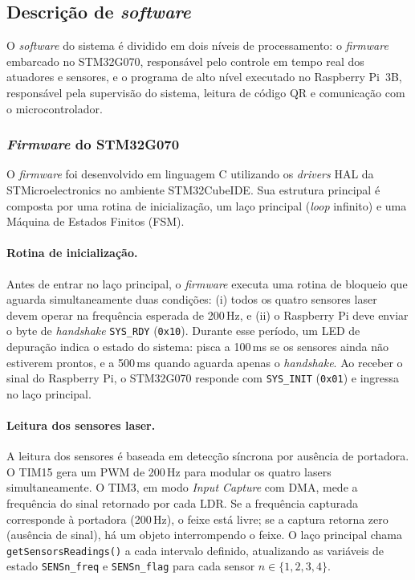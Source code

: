 \subsection{Descrição de \textit{software}}\label{subsec:software}

O \textit{software} do sistema é dividido em dois níveis de processamento:
o \textit{firmware} embarcado no STM32G070, responsável pelo controle em
tempo real dos atuadores e sensores, e o programa de alto nível executado
no Raspberry Pi~3B, responsável pela supervisão do sistema, leitura de
código QR e comunicação com o microcontrolador.

\subsubsection{\textit{Firmware} do STM32G070}

O \textit{firmware} foi desenvolvido em linguagem C utilizando os
\textit{drivers} HAL da STMicroelectronics no ambiente STM32CubeIDE. Sua
estrutura principal é composta por uma rotina de inicialização, um laço
principal (\textit{loop} infinito) e uma Máquina de Estados Finitos (FSM).

\paragraph{Rotina de inicialização.}
Antes de entrar no laço principal, o \textit{firmware} executa uma rotina
de bloqueio que aguarda simultaneamente duas condições: (i) todos os quatro
sensores laser devem operar na frequência esperada de 200\,Hz, e (ii) o
Raspberry Pi deve enviar o byte de \textit{handshake} \texttt{SYS\_RDY}
(\texttt{0x10}). Durante esse período, um LED de depuração indica o estado
do sistema: pisca a 100\,ms se os sensores ainda não estiverem prontos, e a
500\,ms quando aguarda apenas o \textit{handshake}. Ao receber o sinal do
Raspberry Pi, o STM32G070 responde com \texttt{SYS\_INIT} (\texttt{0x01})
e ingressa no laço principal.

\paragraph{Leitura dos sensores laser.}
A leitura dos sensores é baseada em detecção síncrona por ausência de
portadora. O TIM15 gera um PWM de 200\,Hz para modular os quatro lasers
simultaneamente. O TIM3, em modo \textit{Input Capture} com DMA, mede a
frequência do sinal retornado por cada LDR. Se a frequência capturada
corresponde à portadora (200\,Hz), o feixe está livre; se a captura retorna
zero (ausência de sinal), há um objeto interrompendo o feixe. O laço
principal chama \texttt{getSensorsReadings()} a cada intervalo definido,
atualizando as variáveis de estado \texttt{SENSn\_freq} e
\texttt{SENSn\_flag} para cada sensor $n \in \{1,2,3,4\}$.


